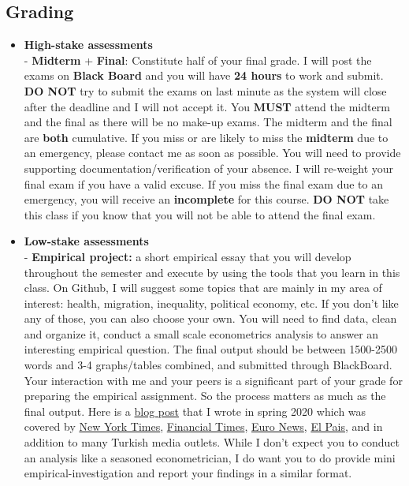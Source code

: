 \documentclass[
]{book}
\begin{document}
\hypertarget{grading}{%
\subsection*{Grading}\label{grading}}

\begin{itemize}
\item
  \textbf{High-stake assessments}\\
  - \textbf{Midterm} + \textbf{Final}: Constitute half of your final grade. I will post the exams on \textbf{Black Board} and you will have \textbf{24 hours} to work and submit. \textbf{DO NOT} try to submit the exams on last minute as the system will close after the deadline and I will not accept it.
  You \textbf{MUST} attend the midterm and the final as there will be no make-up exams. The midterm and the final are \textbf{both} cumulative. If you miss or are likely to miss the \textbf{midterm} due to an emergency, please contact me as soon as possible. You will need to provide supporting documentation/verification of your absence. I will re-weight your final exam if you have a valid excuse. If you miss the final exam due to an emergency, you will receive an \textbf{incomplete} for this course. \textbf{DO NOT} take this class if you know that you will not be able to attend the final exam.
\item
  \textbf{Low-stake assessments}\\
  - \textbf{Empirical project:} a short empirical essay that you will develop throughout the semester and execute by using the tools that you learn in this class. On Github, I will suggest some topics that are mainly in my area of interest: health, migration, inequality, political economy, etc. If you don't like any of those, you can also choose your own. You will need to find data, clean and organize it, conduct a small scale econometrics analysis to answer an interesting empirical question. The final output should be between 1500-2500 words and 3-4 graphs/tables combined, and submitted through BlackBoard. Your interaction with me and your peers is a significant part of your grade for preparing the empirical assignment. So the process matters as much as the final output.
  Here is a \href{https://www.onuraltindag.info/pt-tr/posts/excess_mortality_eng/}{blog post} that I wrote in spring 2020 which was covered by \href{https://www.nytimes.com/2020/04/20/world/middleeast/coronavirus-turkey-deaths.html}{New York Times}, \href{https://www.ft.com/content/80bb222c-b6eb-40ea-8014-563cbe9e0117}{Financial Times}, \href{https://tr.euronews.com/2020/04/23/saglik-bakaninin-new-york-timesa-verdigi-yanit-olumlerdeki-artis-acikliyor-mu-covid-19}{Euro News}, \href{https://elpais.com/sociedad/2020-04-27/el-misterio-turco-uno-de-los-paises-con-mas-casos-de-covid-19-y-menos-muertes.html}{El Pais}, and in addition to many Turkish media outlets. While I don't expect you to conduct an analysis like a seasoned econometrician, I do want you to do provide mini empirical-investigation and report your findings in a similar format.\\

\end{itemize}
\end{document}
